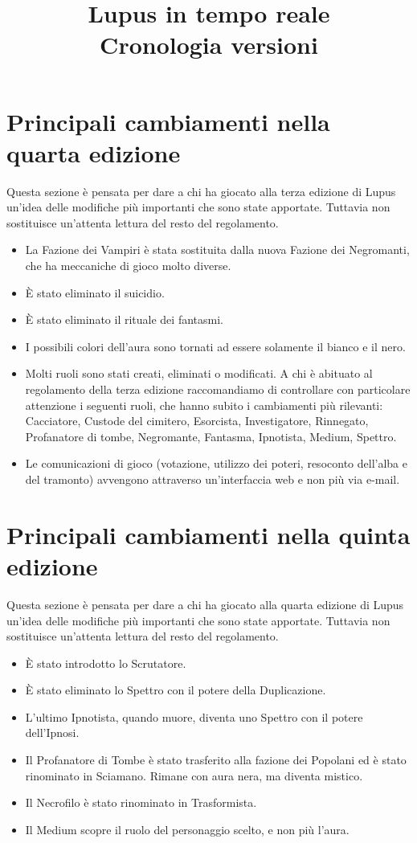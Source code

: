 \documentclass[a4paper,10pt]{article}
\title{Lupus in tempo reale\\ Cronologia versioni}
\begin{document}
	
\maketitle

\section{Principali cambiamenti nella quarta edizione}
 
Questa sezione è pensata per dare a chi ha giocato alla terza edizione di Lupus un'idea delle modifiche più importanti che sono state apportate. Tuttavia non sostituisce un'attenta lettura del resto del regolamento.
 
\begin{itemize}
	\item La Fazione dei Vampiri è stata sostituita dalla nuova Fazione dei	Negromanti, che ha meccaniche di gioco molto diverse.
	\item È stato eliminato il suicidio.
	\item È stato eliminato il rituale dei fantasmi.
	\item I possibili colori dell'aura sono tornati ad essere solamente il bianco e	il nero.
	\item Molti ruoli sono stati creati, eliminati o modificati. A chi è abituato al regolamento della terza edizione raccomandiamo di controllare con particolare	attenzione i seguenti ruoli, che hanno subito i cambiamenti più rilevanti: Cacciatore, Custode del cimitero, Esorcista, Investigatore, Rinnegato, Profanatore di tombe, Negromante, Fantasma, Ipnotista, Medium, Spettro.
	\item Le comunicazioni di gioco (votazione, utilizzo dei poteri, resoconto dell'alba e del tramonto) avvengono attraverso un'interfaccia web e non più via
	e-mail.
\end{itemize}
 
\section{Principali cambiamenti nella quinta edizione}

Questa sezione è pensata per dare a chi ha giocato alla quarta edizione di Lupus un'idea delle modifiche più importanti che sono state apportate. Tuttavia non sostituisce un'attenta lettura del resto del regolamento.

\begin{itemize}
	\item È stato introdotto lo Scrutatore.
	\item È stato eliminato lo Spettro con il potere della Duplicazione.
	\item L'ultimo Ipnotista, quando muore, diventa uno Spettro con il potere dell'Ipnosi.
	\item Il Profanatore di Tombe è stato trasferito alla fazione dei Popolani ed è stato rinominato in Sciamano. Rimane con aura nera, ma diventa mistico.
	\item Il Necrofilo è stato rinominato in Trasformista.
	\item Il Medium scopre il ruolo del personaggio scelto, e non più l'aura.
\end{itemize}
\end{document}
